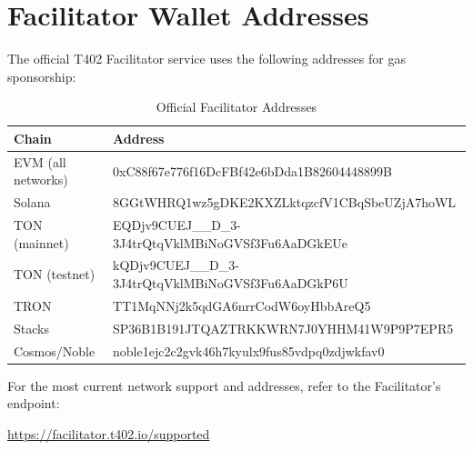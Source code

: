 \section{Facilitator Wallet Addresses}

The official T402 Facilitator service uses the following addresses for gas sponsorship:

\begin{table}[htbp]
\centering
\caption{Official Facilitator Addresses}
\label{tab:facilitator-addresses}
\footnotesize
\begin{tabular}{l >{\ttfamily\scriptsize}p{7cm}}
\toprule
\textbf{Chain} & \normalfont\textbf{Address} \\
\midrule
EVM (all networks) & 0xC88f67e776f16DcFBf42e6bDda1B82604448899B \\
Solana & 8GGtWHRQ1wz5gDKE2KXZLktqzcfV1CBqSbeUZjA7hoWL \\
TON (mainnet) & EQDjv9CUEJ\_\_D\_3-3J4trQtqVklMBiNoGVSf3Fu6AaDGkEUe \\
TON (testnet) & kQDjv9CUEJ\_\_D\_3-3J4trQtqVklMBiNoGVSf3Fu6AaDGkP6U \\
TRON & TT1MqNNj2k5qdGA6nrrCodW6oyHbbAreQ5 \\
Stacks & SP36B1B191JTQAZTRKKWRN7J0YHHM41W9P9P7EPR5 \\
Cosmos/Noble & noble1ejc2c2gvk46h7kyulx9fus85vdpq0zdjwkfav0 \\
\bottomrule
\end{tabular}
\end{table}

\begin{infobox}
For the most current network support and addresses, refer to the Facilitator's  endpoint:
\begin{center}
\url{https://facilitator.t402.io/supported}
\end{center}
\end{infobox}
